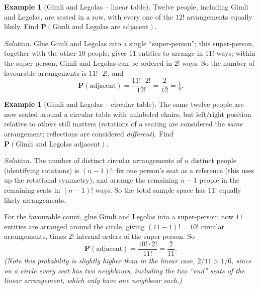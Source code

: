 \documentclass[11pt]{article}
\theoremstyle{definition}
\newtheorem{example}[definition]{Example}
\theoremstyle{plain}
\theoremstyle{remark}
\begin{document}
\begin{example}[Gimli and Legolas -- linear table]
Twelve people, including Gimli and Legolas, are seated in a row, with every one of the $12!$
arrangements equally likely. Find $\mathbf{P}(\text{Gimli and Legolas are adjacent})$.

\emph{Solution.} Glue Gimli and Legolas into a single ``super-person''; this super-person, together
with the other $10$ people, gives $11$ entities to arrange in $11!$ ways; within the super-person,
Gimli and Legolas can be ordered in $2!$ ways. So the number of favourable arrangements is
$11!\cdot 2!$, and
\[
\mathbf{P}(\text{adjacent}) = \frac{11!\cdot 2!}{12!} = \frac{2}{12} = \boxed{\tfrac{1}{6}}.
\]
\end{example}

\begin{example}[Gimli and Legolas -- circular table]
The same twelve people are now seated around a circular table with unlabeled chairs, but
left/right position relative to others still matters (rotations of a seating are considered the
\emph{same} arrangement; reflections are considered \emph{different}). Find
$\mathbf{P}(\text{Gimli and Legolas adjacent})$.

\emph{Solution.} The number of distinct circular arrangements of $n$ distinct people (identifying
rotations) is $(n-1)!$: fix one person's seat as a reference (this uses up the rotational
symmetry), and arrange the remaining $n-1$ people in the remaining seats in $(n-1)!$ ways. So the
total sample space has $11! $ equally likely arrangements.

For the favourable count, glue Gimli and Legolas into a super-person; now $11$ entities are
arranged around the circle, giving $(11-1)! = 10!$ circular arrangements, times $2!$ internal
orders of the super-person. So
\[
\mathbf{P}(\text{adjacent}) = \frac{10!\cdot 2!}{11!} = \frac{2}{11}.
\]
\emph{(Note this probability is slightly higher than in the linear case, $2/11 > 1/6$, since on a
circle every seat has two neighbours, including the two ``end'' seats of the linear arrangement,
which only have one neighbour each.)}
\end{example}
\end{document}
